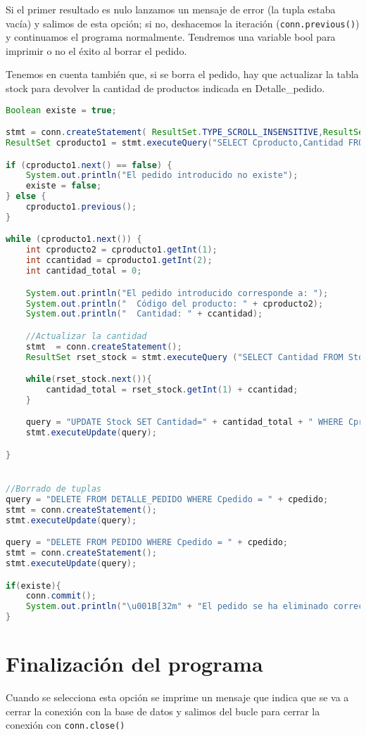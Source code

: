 Si el primer resultado es nulo lanzamos un mensaje de error (la tupla estaba vacía) y salimos de esta opción; si no, deshacemos la iteración (\texttt{conn.previous()}) y continuamos el programa normalmente. Tendremos una variable bool para imprimir o no el éxito al borrar el pedido.

Tenemos en cuenta también que, si se borra el pedido, hay que actualizar la tabla stock para devolver la cantidad de productos indicada en Detalle\_pedido.

\begin{lstlisting}[language=Java]
Boolean existe = true;

stmt = conn.createStatement( ResultSet.TYPE_SCROLL_INSENSITIVE,ResultSet.CONCUR_READ_ONLY);
ResultSet cproducto1 = stmt.executeQuery("SELECT Cproducto,Cantidad FROM Detalle_pedido WHERE Cpedido='"+ cpedido + "'");

if (cproducto1.next() == false) {
	System.out.println("El pedido introducido no existe");
	existe = false;
} else {
	cproducto1.previous();
}

while (cproducto1.next()) {
	int cproducto2 = cproducto1.getInt(1);
	int ccantidad = cproducto1.getInt(2);
	int cantidad_total = 0;

	System.out.println("El pedido introducido corresponde a: ");
	System.out.println("  Código del producto: " + cproducto2);
	System.out.println("  Cantidad: " + ccantidad);

	//Actualizar la cantidad
	stmt  = conn.createStatement();
	ResultSet rset_stock = stmt.executeQuery ("SELECT Cantidad FROM Stock WHERE Cproducto='" + cproducto2 + "'");

	while(rset_stock.next()){
		cantidad_total = rset_stock.getInt(1) + ccantidad;
	}

	query = "UPDATE Stock SET Cantidad=" + cantidad_total + " WHERE Cproducto='" + cproducto2+ "'";
	stmt.executeUpdate(query);

}


//Borrado de tuplas
query = "DELETE FROM DETALLE_PEDIDO WHERE Cpedido = " + cpedido;
stmt = conn.createStatement();
stmt.executeUpdate(query);

query = "DELETE FROM PEDIDO WHERE Cpedido = " + cpedido;
stmt = conn.createStatement();
stmt.executeUpdate(query);

if(existe){
	conn.commit();
	System.out.println("\u001B[32m" + "El pedido se ha eliminado correctamente" + "\u001B[0m");
}
\end{lstlisting}


\section{Finalización del programa}

Cuando se selecciona esta opción se imprime un mensaje que indica que se va a cerrar la conexión con la base de datos y salimos del bucle para cerrar la conexión con \texttt{conn.close()}
